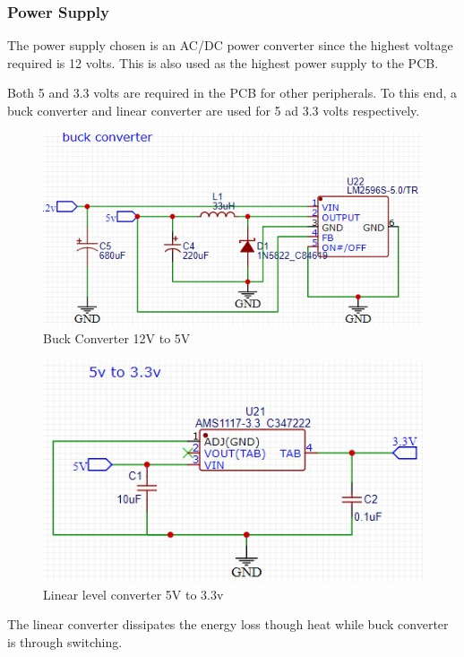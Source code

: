 \subsubsection{Power Supply}
The power supply chosen is an AC/DC power converter since the highest voltage required is 12 volts. This is also used as the highest power supply to the PCB.

Both 5 and 3.3 volts are required in the PCB for other peripherals. To this end, a buck converter and linear converter are used for 5 ad 3.3 volts respectively.

\begin{center}
	\begin{figure}[H]
		\centering
		\includegraphics{Figures/buck}
		\caption[Buck converter]{Buck Converter 12V to 5V}
	\end{figure}
\end{center}

\begin{center}
	\begin{figure}[H]
		\centering
		\includegraphics{Figures/5233}
		\caption[Linear Voltage Converter]{Linear level converter 5V to 3.3v}
	\end{figure}
\end{center}
The linear converter dissipates the energy loss though heat while buck converter is through switching.

